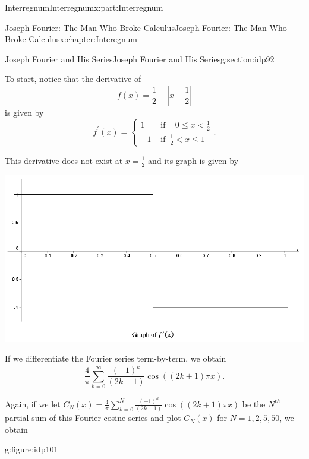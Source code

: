 \documentclass[oneside,10pt,]{book}
\numberwithin{equation}{section}
\newcommand{\abs}[1]{\left|#1\right|}
\newcommand{\lt}{<}
\newcommand{\amp}{&}
\begin{document}
\begin{partptx}{Interregnum}{}{Interregnum}{}{}{x:part:Interregnum}
\begin{chapterptx}{Joseph Fourier: The Man Who Broke Calculus}{}{Joseph Fourier: The Man Who Broke Calculus}{}{}{x:chapter:Interegnum}
\begin{sectionptx}{Joseph Fourier and His Series}{}{Joseph Fourier and His Series}{}{}{g:section:idp92}
\par
To start, notice that the derivative of%
\begin{equation*}
f(x)=\frac{1}{2}-\abs{x-\frac{1}{2}}
\end{equation*}
is given by%
\begin{equation*}
f^\prime(x) = \begin{cases}1\amp \text{ if } \,\text{ } 0\leq x\lt \frac{1}{2}\\ -1\amp \text{ if } \,\frac{1}{2}\lt x\leq 1 \end{cases} \text{.}
\end{equation*}
%
\par
This derivative does not exist at \(x=\frac{1}{2}\) and its graph is given by%
\begin{image}{0.125}{0.75}{0.125}%
\includegraphics[width=\linewidth]{images/Ch2fig1.png}
\end{image}%
If we differentiate the Fourier series term-by-term, we obtain%
\begin{equation*}
\frac{4}{\pi}\sum_{k=0}^\infty\frac{\left(-1\right)^k}{\left(2k+1\right)} \cos\left(\left(2k+1\right)\pi x\right)\text{.}
\end{equation*}
%
\par
Again, if we let \(C_N(x)=\frac{4}{\pi}\sum_{k=0}^N\frac{\left(-1\right)^k}{\left(2k+1\right)} \cos\left(\left(2k+1\right)\pi x\right)\) be the \(N^{th}\) partial sum of this Fourier cosine series and plot \(C_N(x)\) for \(N=1,2,5,50\), we obtain%
\begin{figureptx}{}{g:figure:idp101}{}%
\centering
\begin{image}{0}{1}{0}%

\end{image}
\end{figureptx}
\end{sectionptx}
\end{chapterptx}
\end{partptx}
\end{document}
